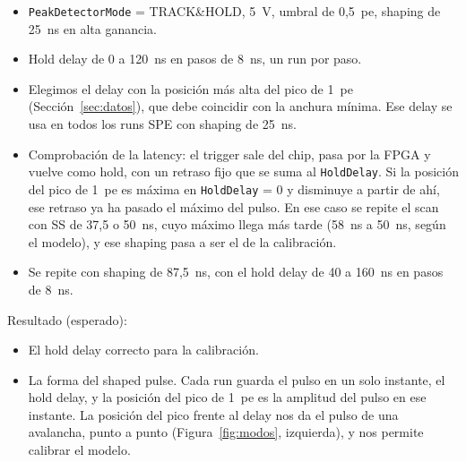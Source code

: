 \documentclass[11pt,a4paper]{article}
\begin{document}
\begin{itemize}
\item \texttt{PeakDetectorMode} = TRACK\&HOLD, 5~V, umbral de 0,5~pe, shaping
  de 25~ns en alta ganancia.
\item Hold delay de 0 a 120~ns en pasos de 8~ns, un run por paso.
\item Elegimos el delay con la posición más alta del pico de 1~pe
  (Sección~\ref{sec:datos}), que debe
  coincidir con la anchura mínima. Ese delay se usa en todos los runs SPE
  con shaping de 25~ns.
\item Comprobación de la latency: el trigger sale del chip, pasa por la FPGA
  y vuelve como hold, con un retraso fijo que se suma al \texttt{HoldDelay}. Si la
  posición del pico de 1~pe es máxima en \texttt{HoldDelay} = 0 y disminuye a
  partir de ahí, ese retraso ya ha pasado el máximo del pulso. En ese caso se repite el scan
  con SS de 37,5 o 50~ns, cuyo máximo llega más tarde (58~ns a 50~ns, según
  el modelo), y ese shaping pasa a ser el de la calibración.
\item Se repite con shaping de 87,5~ns, con el hold delay de 40 a 160~ns en
  pasos de 8~ns.
\end{itemize}

\noindent Resultado (esperado):
\begin{itemize}
\item El hold delay correcto para la calibración.
\item La forma del shaped pulse. Cada run guarda el pulso en un solo
  instante, el hold delay, y la posición del pico de 1~pe es la amplitud del
  pulso en ese instante. La posición del pico frente al delay nos da el
  pulso de una avalancha, punto a punto (Figura~\ref{fig:modos},
  izquierda), y nos permite calibrar el modelo.
\end{itemize}
\end{document}
